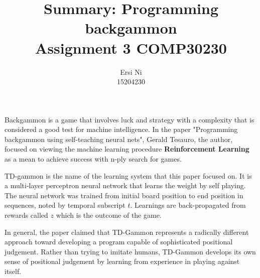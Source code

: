 \documentclass{scrartcl}
\title{Summary: Programming backgammon \\
 \large Assignment 3 COMP30230}
\author{Ersi Ni\\
\large 15204230}
\begin{document}
\maketitle


Backgammon is a game that involves luck and strategy with a complexity that is considered a good test for machine intelligence. In the paper "Programming backgammon using self-teaching neural nets", Gerald Tesauro, the author, focused on viewing the machine learning procedure \textbf{Reinforcement Learning} as a mean to achieve success with n-ply search for games. 

TD-gammon is the name of the learning system that this paper focused on. It is a multi-layer perceptron neural network that learns the weight by self playing. The neural network was trained from initial board position to end position in sequences, noted by temporal subscript $t$. Learnings are back-propagated from rewards called $z$ which is the outcome of the game. 

In general, the paper claimed that TD-Gammon represents a radically different approach toward developing a program capable of sophisticated positional judgement. Rather than trying to imitate humans, TD-Gammon develops its own sense of positional judgement by learning from experience in playing against itself.
\end{document}
